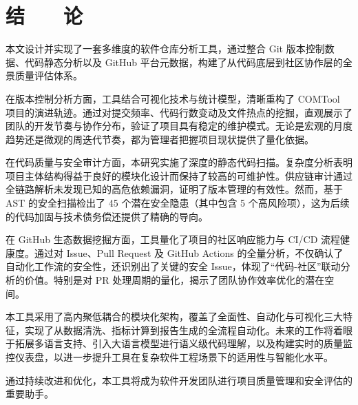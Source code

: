 \chapter*{\hfill 结　　论 \hfill}

本文设计并实现了一套多维度的软件仓库分析工具，通过整合 Git 版本控制数据、代码静态分析以及 GitHub 平台元数据，构建了从代码底层到社区协作层的全景质量评估体系。

在版本控制分析方面，工具结合可视化技术与统计模型，清晰重构了 COMTool 项目的演进轨迹。通过对提交频率、代码行数变动及文件热点的挖掘，直观展示了团队的开发节奏与协作分布，验证了项目具有稳定的维护模式。无论是宏观的月度趋势还是微观的周迭代节奏，都为管理者把握项目现状提供了量化依据。

在代码质量与安全审计方面，本研究实施了深度的静态代码扫描。复杂度分析表明项目主体结构得益于良好的模块化设计而保持了较高的可维护性。供应链审计通过全链路解析未发现已知的高危依赖漏洞，证明了版本管理的有效性。然而，基于 AST 的安全扫描检出了 45 个潜在安全隐患（其中包含 5 个高风险项），这为后续的代码加固与技术债务偿还提供了精确的导向。

在 GitHub 生态数据挖掘方面，工具量化了项目的社区响应能力与 CI/CD 流程健康度。通过对 Issue、Pull Request 及 GitHub Actions 的全量分析，不仅确认了自动化工作流的安全性，还识别出了关键的安全 Issue，体现了“代码-社区”联动分析的价值。特别是对 PR 处理周期的量化，揭示了团队协作效率优化的潜在空间。

本工具采用了高内聚低耦合的模块化架构，覆盖了全面性、自动化与可视化三大特征，实现了从数据清洗、指标计算到报告生成的全流程自动化。未来的工作将着眼于拓展多语言支持、引入大语言模型进行语义级代码理解，以及构建实时的质量监控仪表盘，以进一步提升工具在复杂软件工程场景下的适用性与智能化水平。

通过持续改进和优化，本工具将成为软件开发团队进行项目质量管理和安全评估的重要助手。


